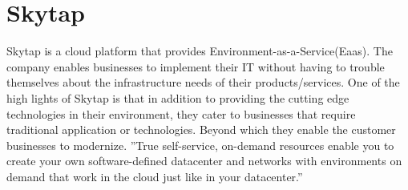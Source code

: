 \section{Skytap}

Skytap is a cloud platform that provides Environment-as-a-Service(Eaas). The
company enables businesses to implement their IT without having to
trouble themselves about the infrastructure needs of their products/services.
One of the high lights of Skytap is that in addition to providing the
cutting edge technologies in their environment, they cater to businesses that
require traditional application or technologies. Beyond which they enable the
customer businesses to modernize. ''True self-service, on-demand resources
enable you to create your own software-defined datacenter and networks with
environments on demand that work in the cloud just like in your 
datacenter.''~\cite{hid-sp18-411-skytap}
